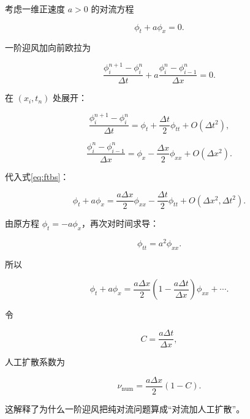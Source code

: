 \documentclass[UTF8,12pt,a4paper,fontset=fandol]{ctexart}
\numberwithin{equation}{section}
\begin{document}
考虑一维正速度 $a>0$ 的对流方程

\begin{equation}
  \phi_t+a\phi_x=0.
\end{equation}

一阶迎风加向前欧拉为

\begin{equation}
  \frac{\phi_i^{n+1}-\phi_i^n}{\Delta t}
  +
  a\frac{\phi_i^n-\phi_{i-1}^n}{\Delta x}
  =0.
  \label{eq:ftbs}
\end{equation}

在 $(x_i,t_n)$ 处展开：

\begin{equation}
  \frac{\phi_i^{n+1}-\phi_i^n}{\Delta t}
  =
  \phi_t
  +\frac{\Delta t}{2}\phi_{tt}
  +O(\Delta t^2),
\end{equation}

\begin{equation}
  \frac{\phi_i^n-\phi_{i-1}^n}{\Delta x}
  =
  \phi_x
  -\frac{\Delta x}{2}\phi_{xx}
  +O(\Delta x^2).
\end{equation}

代入式\eqref{eq:ftbs}：

\begin{equation}
  \phi_t+a\phi_x
  =
  \frac{a\Delta x}{2}\phi_{xx}
  -
  \frac{\Delta t}{2}\phi_{tt}
  +O(\Delta x^2,\Delta t^2).
\end{equation}

由原方程 $\phi_t=-a\phi_x$，再次对时间求导：

\begin{equation}
  \phi_{tt}=a^2\phi_{xx}.
\end{equation}

所以

\begin{equation}
  \boxed{
  \phi_t+a\phi_x
  =
  \frac{a\Delta x}{2}
  \left(1-\frac{a\Delta t}{\Delta x}\right)
  \phi_{xx}
  +\cdots
  }.
\end{equation}

令

\begin{equation}
  C=\frac{a\Delta t}{\Delta x},
\end{equation}

人工扩散系数为

\begin{equation}
  \nu_{\mathrm{num}}
  =
  \frac{a\Delta x}{2}(1-C).
  \label{eq:numerical_diffusion}
\end{equation}

这解释了为什么一阶迎风把纯对流问题算成“对流加人工扩散”。
\end{document}
